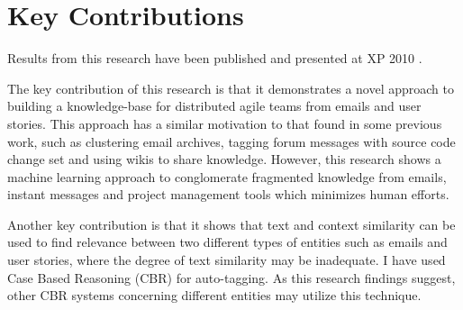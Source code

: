 \section{Key Contributions}
Results from this research have been published and presented at XP 2010 \cite{auto_tagging}. 

The key contribution of this research is that it demonstrates a novel approach to building a knowledge-base for distributed agile teams from emails and user stories. This approach has a similar motivation to that found in some previous work, such as clustering email archives\cite{using_hybrid}, tagging forum messages with source code change set\cite{hipikat, hipikat_2} and using wikis to share knowledge. However, this research shows a machine learning approach to conglomerate fragmented knowledge from emails, instant messages and project management tools which minimizes human efforts.
                                  
Another key contribution is that it shows that text and context similarity can be used to find relevance between two different types of entities such as emails and user stories, where the degree of text similarity may be inadequate. I have used Case Based Reasoning (CBR) for auto-tagging. As this research findings suggest, other CBR systems concerning different entities may utilize this technique.

